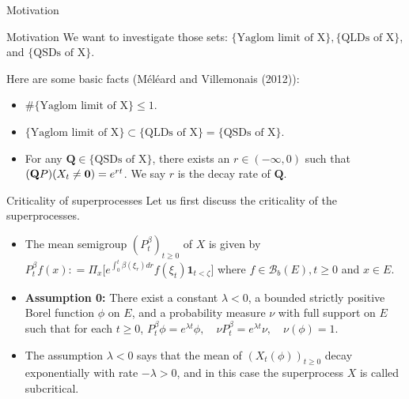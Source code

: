 \documentclass[xcolor=dvipsnames]{beamer}
\begin{document}
\begin{frame}{Motivation}
\begin{block}{Motivation}
	We want to investigate those sets: $\{\text{Yaglom limit of X}\}, \{\text{QLDs of X}\}$, and  $\{\text{QSDs of X}\}$.
\end{block}
Here are some basic facts (M\'el\'eard and Villemonais (2012)):
\begin{itemize}
\item 
	$\# \{\text{Yaglom limit of X}\} \leq 1$.
\item
	$ \{\text{Yaglom limit of X}\} \subset \{\text{QLDs of X}\} = \{\text{QSDs of X}\}$.
\item
	For any $\mathbf Q \in \{\text{QSDs of X}\}$, there exists an $r \in (-\infty, 0)$ such that $(\mathbf Q \mathbb \mathbb P)(X_t \neq \mathbf 0) = e^{rt}$. We say $r$ is the {\color{red} decay rate} of $\mathbf Q$.
\end{itemize}
\end{frame}

\begin{frame}{Criticality of superprocesses}
	Let us first discuss the criticality of the superprocesses.
\begin{itemize}
\item 
	{\color{red} The mean semigroup $(P_t^\beta)_{t\geq 0}$ of $X$} is given by 
$
	P_t^\beta f(x) : = \Pi_x\Big[e^{\int_0^t \beta(\xi_r) dr} f(\xi_t) \mathbf 1_{t< \zeta}\Big]
$
	where $f \in \mathcal B_b(E), t\geq 0$ and $x\in E$.
\item
	{\bf Assumption 0:} There exist a constant $\lambda < 0$, a bounded strictly positive Borel function $\phi$ on $E$, and a probability measure $\nu$ with full support on $E$ such that for each $t\geq 0$,
$
	P_t^\beta \phi = e^{\lambda t}\phi,
	\quad \nu P_t^\beta = e^{\lambda t}\nu,
	\quad \nu(\phi) = 1.
$
\item
	The assumption $\lambda < 0$ says that the mean of $(X_t(\phi))_{t\geq 0}$ decay exponentially with rate $-\lambda>0$, and in this case the superprocess $X$ is called {\color{red} subcritical}. 
\end{itemize}
\end{frame}
\end{document}
